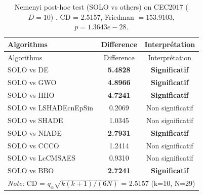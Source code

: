 \begin{center}
\small
\renewcommand{\arraystretch}{1.25}
\begin{longtable}{lcc}
\caption{Nemenyi post-hoc test (SOLO vs others) on CEC2017 ($D=10$) . CD = 2.5157, Friedman $=153.9103$, $p=1.3643e-28$.}
\label{tab:nemenyi_CEC2017_10} \\
\toprule
Algorithms & Difference & Interprétation \\
\midrule
\endfirsthead
\toprule
Algorithms & Difference & Interprétation \\
\midrule
\endhead
SOLO vs DE & \textbf{5.4828} & \textbf{Significatif} \\
SOLO vs GWO & \textbf{4.8966} & \textbf{Significatif} \\
SOLO vs HHO & \textbf{4.7241} & \textbf{Significatif} \\
SOLO vs LSHADEcnEpSin & 0.2069 & Non significatif \\
SOLO vs SHADE & 1.0345 & Non significatif \\
SOLO vs NIADE & \textbf{2.7931} & \textbf{Significatif} \\
SOLO vs CCCO & 1.2414 & Non significatif \\
SOLO vs LcCMSAES & 0.9310 & Non significatif \\
SOLO vs BBO & \textbf{2.7241} & \textbf{Significatif} \\
\midrule
\multicolumn{3}{l}{\textit*{Note:} CD = $q_\alpha \sqrt{k(k+1)/(6N)}$ = 2.5157 (k=10, N=29)} \\
\bottomrule
\end{longtable}
\end{center}